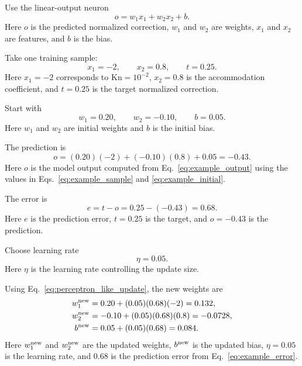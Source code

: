 \documentclass[11pt]{article}
\newcommand{\kn}{\mathrm{Kn}}
\begin{document}
Use the linear-output neuron
\begin{equation}
    o = w_1x_1+w_2x_2+b.
    \label{eq:example_output}
\end{equation}
Here $o$ is the predicted normalized correction, $w_1$ and $w_2$ are weights, $x_1$ and $x_2$ are features, and $b$ is the bias.

Take one training sample:
\begin{equation}
    x_1=-2, \qquad x_2=0.8, \qquad t=0.25.
    \label{eq:example_sample}
\end{equation}
Here $x_1=-2$ corresponds to $\kn=10^{-2}$, $x_2=0.8$ is the accommodation coefficient, and $t=0.25$ is the target normalized correction.

Start with
\begin{equation}
    w_1=0.20, \qquad w_2=-0.10, \qquad b=0.05.
    \label{eq:example_initial}
\end{equation}
Here $w_1$ and $w_2$ are initial weights and $b$ is the initial bias.

The prediction is
\begin{equation}
    o=(0.20)(-2)+(-0.10)(0.8)+0.05=-0.43.
    \label{eq:example_prediction}
\end{equation}
Here $o$ is the model output computed from Eq.~\eqref{eq:example_output} using the values in Eqs.~\eqref{eq:example_sample} and \eqref{eq:example_initial}.

The error is
\begin{equation}
    e=t-o=0.25-(-0.43)=0.68.
    \label{eq:example_error}
\end{equation}
Here $e$ is the prediction error, $t=0.25$ is the target, and $o=-0.43$ is the prediction.

Choose learning rate
\begin{equation}
    \eta=0.05.
    \label{eq:example_eta}
\end{equation}
Here $\eta$ is the learning rate controlling the update size.

Using Eq.~\eqref{eq:perceptron_like_update}, the new weights are
\begin{align}
    w_1^{\rm new} &= 0.20 + (0.05)(0.68)(-2)=0.132, \label{eq:example_w1new}\\
    w_2^{\rm new} &= -0.10 + (0.05)(0.68)(0.8)=-0.0728, \label{eq:example_w2new}\\
    b^{\rm new} &= 0.05 + (0.05)(0.68)=0.084. \label{eq:example_bnew}
\end{align}
Here $w_1^{\rm new}$ and $w_2^{\rm new}$ are the updated weights, $b^{\rm new}$ is the updated bias, $\eta=0.05$ is the learning rate, and $0.68$ is the prediction error from Eq.~\eqref{eq:example_error}.
\end{document}

